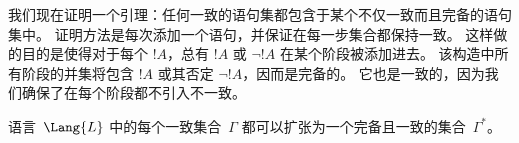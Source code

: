 \documentclass[../../../include/open-logic-section]{subfiles}
\begin{document}
      {}
      {}


\begin{explain}
我们现在证明一个引理：任何一致的语句集都包含于某个不仅一致而且完备的语句集中。
证明方法是每次添加一个语句，并保证在每一步集合都保持一致。
这样做的目的是使得对于每个 $!A$，总有 $!A$ 或 $\lnot !A$ 在某个阶段被添加进去。
该构造中所有阶段的并集将包含 $!A$ 或其否定 $\lnot !A$，因而是完备的。
它也是一致的，因为我们确保了在每个阶段都不引入不一致。
\end{explain}

\begin{lem}[Lindenbaum 引理]
 语言~$\Lang{L}$ 中的每个一致集合~$\Gamma$ 都可以扩张为一个完备且一致的集合~$\Gamma^*$。
\end{lem}
\end{document}
